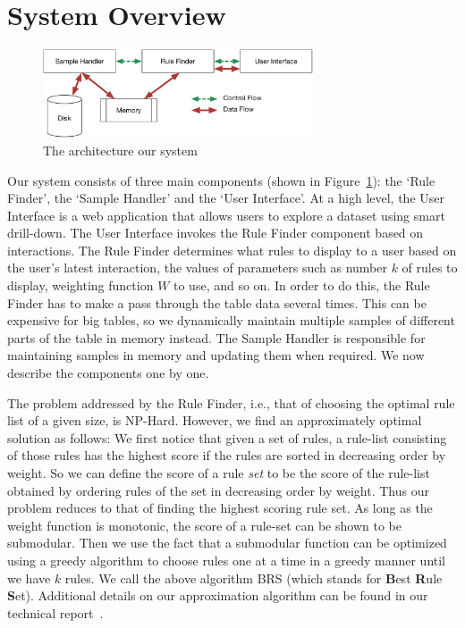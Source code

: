 
\section{System Overview}\label{sec:system}

\begin{figure}
\vspace{-5pt}
\centering
\includegraphics[width=80mm]{graphs/arch.pdf}
\vspace{-10pt}
\caption{The architecture our system \label{fig:system}}
\vspace{-15pt}
\end{figure}

Our system consists of three main components (shown in Figure~\ref{fig:system}): the `Rule Finder', the `Sample Handler' and the `User Interface'. 
At a high level, the User Interface is a web application that allows users to explore
a dataset using smart drill-down. The User Interface invokes the Rule Finder component based on interactions.
The Rule Finder determines what rules to display to a user based on the user's latest interaction, the values of parameters such as number $k$ of rules to display, weighting function $W$ to use, and so on. 
In order to do this, the Rule Finder has to make a pass through the table data several times. This can be expensive for big tables, so we dynamically maintain multiple samples of different parts of the table in memory instead. The Sample Handler is responsible for maintaining samples in memory and updating them when required. 
We now describe the components one by one.

 The problem addressed by the Rule Finder, i.e., that of choosing the optimal rule list of a given size, is NP-Hard. However, we find an approximately optimal solution as follows: We first notice that given a set of rules, a rule-list consisting of those rules has the highest score if the rules are sorted in decreasing order by weight. So we can define the score of a rule {\em set} to be the score of the rule-list obtained by ordering rules of the set in decreasing order by weight. Thus our problem reduces to that of finding the highest scoring rule set. As long as the weight function is monotonic, the score of a rule-set can be shown to be submodular. Then we use the fact that a submodular function can be optimized using a greedy algorithm to choose rules one at a time in a greedy manner until we have $k$ rules. We call the above algorithm BRS (which stands for {\bf B}est {\bf R}ule {\bf S}et). Additional details on our approximation algorithm can be found in our technical report~\cite{tr}. 

